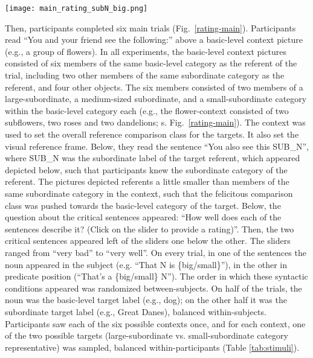 \begin{figure*}[t]
	\begin{center}
		\texttt{[image: main\_rating\_subN\_big.png]}
	\end{center}
	\caption{Example view of a sentence rating main trial: The critical noun is a subordinate target label of a large-subordinate category, appearing in the subject or predicate of the sentence.}
	\label{rating-main}
\end{figure*}
Then, participants completed six main trials (Fig.~\ref{rating-main}). Participants read “You and your friend see the following:” above a basic-level context picture (e.g., a group of flowers). In all experiments, the basic-level context pictures consisted of six members of the same basic-level category as the referent of the trial, including two other members of the same subordinate category as the referent, and four other objects. The six members consisted of two members of a large-subordinate, a medium-sized subordinate, and a small-subordinate category within the basic-level category each (e.g., the flower-context consisted of two subflowers, two roses and two dandelions; s. Fig.~\ref{rating-main}). The context was used to set the overall reference comparison class for the targets. It also set the visual reference frame.
Below, they read the sentence “You also see this SUB\_N”, where SUB\_N was the subordinate label of the target referent, which appeared depicted below, such that participants knew the subordinate category of the referent. The pictures depicted referents a little smaller than members of the same subordinate category in the context, such that the felicitous comparison class was pushed towards the basic-level category of the target.
Below, the question about the critical sentences appeared: “How well does each of the sentences describe it? (Click on the slider to provide a rating)”. Then, the two critical sentences appeared left of the sliders one below the other. The sliders ranged from “very bad” to “very well”. On every trial, in one of the sentences the noun appeared in the subject (e.g. “That N is \{big/small\}”), in the other in predicate position (“That’s a \{big/small\} N”). The order in which these syntactic conditions appeared was randomized between-subjects. 
On half of the trials, the noun was the basic-level target label (e.g., dog); on the other half it was the subordinate target label (e.g., Great Danes), balanced within-subjects. 
Participants saw each of the six possible contexts once, and for each context, one of the two possible targets (large-subordinate vs. small-subordinate category representative) was sampled, balanced within-participants (Table \ref{tab:stimuli}). 

